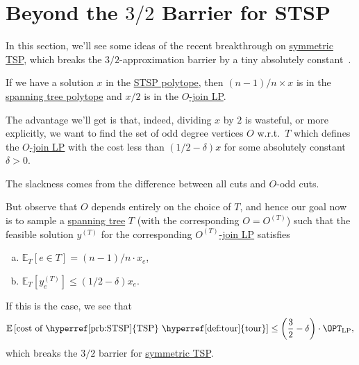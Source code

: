 \section{Beyond the \(3 / 2\) Barrier for STSP}
In this section, we'll see some ideas of the recent breakthrough on \hyperref[prb:STSP]{symmetric TSP}, which breaks the \(3 / 2\)-approximation barrier by a tiny absolutely constant~\cite{10.1145/3406325.3451009}.
\begin{prev}
	If we have a solution \(x\) in the \hyperref[eq:STSP-polytope]{STSP polytope}, then \((n-1) / n \times x\) is in the \hyperref[eq:spanning-tree-polytope]{spanning tree polytope} and \(x / 2\) is in the \hyperref[eq:O-join-LP]{\(O\)-join LP}.
\end{prev}

The advantage we'll get is that, indeed, dividing \(x\) by \(2\) is wasteful, or more explicitly, we want to find the set of odd degree vertices \(O\) w.r.t.\ \(T\) which defines the \hyperref[eq:O-join-LP]{\(O\)-join LP} with the cost less than \((1 / 2 - \delta )x\) for some absolutely constant \(\delta > 0\).

\begin{intuition}
	The slackness comes from the difference between all cuts and \(O\)-odd cuts.
\end{intuition}

But observe that \(O\) depends entirely on the choice of \(T\), and hence our goal now is to sample a \hyperref[def:spanning-tree]{spanning tree} \(T\) (with the corresponding \(O = O^{(T)}\)) such that the feasible solution \(y^{(T)}\) for the corresponding \hyperref[eq:O-join-LP]{\(O^{(T)}\)-join LP} satisfies
\begin{enumerate}[(a)]
	\item \(\mathbb{E}_{T}\left[e\in T \right] = (n-1) / n \cdot x_e\),
	\item \(\mathbb{E}_{T}\left[y^{(T)}_e \right] \leq (1 / 2 - \delta )x_e\).
\end{enumerate}
If this is the case, we see that
\[
	\mathbb{E}\left[ \text{cost of \hyperref[prb:STSP]{TSP} \hyperref[def:tour]{tour}} \right] \leq \left( \frac{3}{2} - \delta  \right) \cdot \OPT_{\mathrm{LP}},
\]
which breaks the \(3 / 2\) barrier for \hyperref[prb:STSP]{symmetric TSP}.

